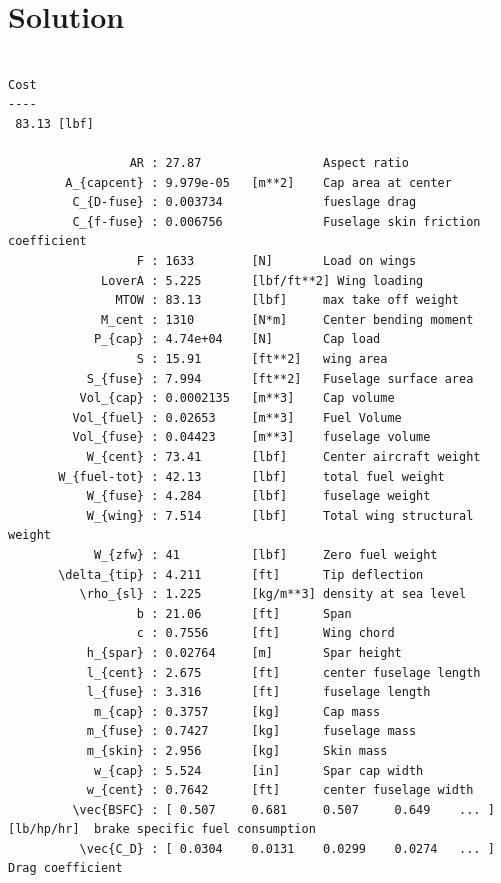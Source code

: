 \documentclass[10pt, a4paper]{article}
\begin{document}
\newpage

\section*{Solution}
\begin{verbatim}

Cost
----
 83.13 [lbf] 

                 AR : 27.87                 Aspect ratio      
        A_{capcent} : 9.979e-05   [m**2]    Cap area at center      
         C_{D-fuse} : 0.003734              fueslage drag     
         C_{f-fuse} : 0.006756              Fuselage skin friction coefficient
                  F : 1633        [N]       Load on wings     
             LoverA : 5.225       [lbf/ft**2] Wing loading      
               MTOW : 83.13       [lbf]     max take off weight     
             M_cent : 1310        [N*m]     Center bending moment       
            P_{cap} : 4.74e+04    [N]       Cap load      
                  S : 15.91       [ft**2]   wing area     
           S_{fuse} : 7.994       [ft**2]   Fuselage surface area       
          Vol_{cap} : 0.0002135   [m**3]    Cap volume        
         Vol_{fuel} : 0.02653     [m**3]    Fuel Volume       
         Vol_{fuse} : 0.04423     [m**3]    fuselage volume     
           W_{cent} : 73.41       [lbf]     Center aircraft weight      
       W_{fuel-tot} : 42.13       [lbf]     total fuel weight     
           W_{fuse} : 4.284       [lbf]     fuselage weight     
           W_{wing} : 7.514       [lbf]     Total wing structural weight      
            W_{zfw} : 41          [lbf]     Zero fuel weight      
       \delta_{tip} : 4.211       [ft]      Tip deflection      
          \rho_{sl} : 1.225       [kg/m**3] density at sea level        
                  b : 21.06       [ft]      Span      
                  c : 0.7556      [ft]      Wing chord        
           h_{spar} : 0.02764     [m]       Spar height       
           l_{cent} : 2.675       [ft]      center fuselage length      
           l_{fuse} : 3.316       [ft]      fuselage length     
            m_{cap} : 0.3757      [kg]      Cap mass      
           m_{fuse} : 0.7427      [kg]      fuselage mass     
           m_{skin} : 2.956       [kg]      Skin mass     
            w_{cap} : 5.524       [in]      Spar cap width      
           w_{cent} : 0.7642      [ft]      center fuselage width       
         \vec{BSFC} : [ 0.507     0.681     0.507     0.649    ... ]  [lb/hp/hr]  brake specific fuel consumption   
          \vec{C_D} : [ 0.0304    0.0131    0.0299    0.0274   ... ]        Drag coefficient      

\end{verbatim}
\end{document}
